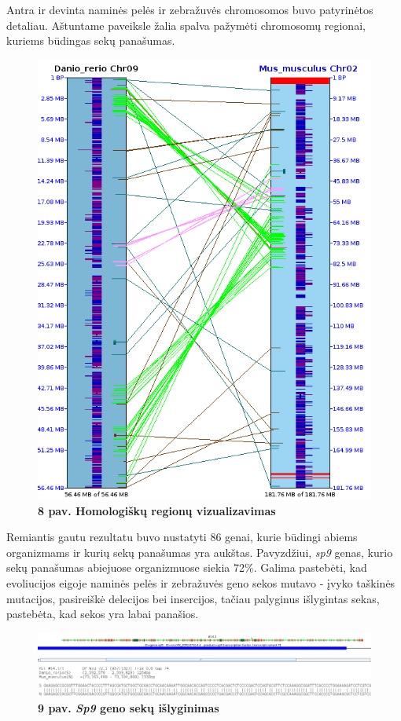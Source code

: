 \documentclass[12pt]{article}
\begin{document}
Antra ir devinta naminės pelės ir zebražuvės chromosomos buvo patyrinėtos
detaliau. Aštuntame paveiksle žalia spalva pažymėti chromosomų regionai, kuriems
būdingas sekų panašumas.

\begin{figure}[htb]
    \begin{center}
        \includegraphics[width=0.4\linewidth]{../Figures/Chr2_9_synteny.png}
        \vspace{-1\baselineskip}
        \caption*{\small\textbf{8 pav. Homologiškų regionų vizualizavimas}}
        \label{fig:8}
    \end{center}
\end{figure}

\newpage

Remiantis gautu rezultatu buvo nustatyti 86 genai, kurie būdingi abiems
organizmams ir kurių sekų panašumas yra aukštas. Pavyzdžiui, \emph{sp9} genas,
kurio sekų panašumas abiejuose organizmuose siekia 72\%. Galima pastebėti, kad
evoliucijos eigoje naminės pelės ir zebražuvės geno sekos mutavo - įvyko
taškinės mutacijos, pasireiškė delecijos bei insercijos, tačiau palyginus
išlygintas sekas, pastebėta, kad sekos yra labai panašios.

\begin{figure}[htb]
    \begin{center}
        \includegraphics[width=1\linewidth]{../Figures/Sp9_gene_alignment.png}
        \vspace{-1\baselineskip}
        \caption*{\small\textbf{9 pav. \emph{Sp9} geno sekų išlyginimas}}
        \label{fig:9}
    \end{center}
\end{figure}
\end{document}
